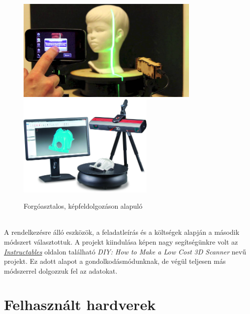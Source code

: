 \documentclass[12pt,a4paper]{article}
\begin{document}
	\begin{figure}[h!]
		\begin{center}
			\includegraphics[height=5cm]{images/Mobile_Scan}
			\includegraphics[height=5cm]{images/PC_Scan}
		\end{center}
		\caption{Forgóasztalos, képfeldolgozáson alapuló\cite{MobileScan}\cite{PCScan}}
	\end{figure}\\[10pt]
	A rendelkezésre álló eszközök, a feladatleírás és a költségek alapján a második módszert választottuk. A projekt kiindulása képen nagy segítségünkre volt az \href{http://www.instructables.com/id/3D-Laser-Scanning-DIY/}{\textit{Instructables}} oldalon található \textit{DIY: How to Make a Low Cost 3D Scanner}\cite{LaserScannerProjekt} nevű projekt. Ez adott alapot a gondolkodásmódunknak, de végül teljesen más módszerrel dolgozzuk fel az adatokat.

\section{Felhasznált hardverek} %
\end{document}
